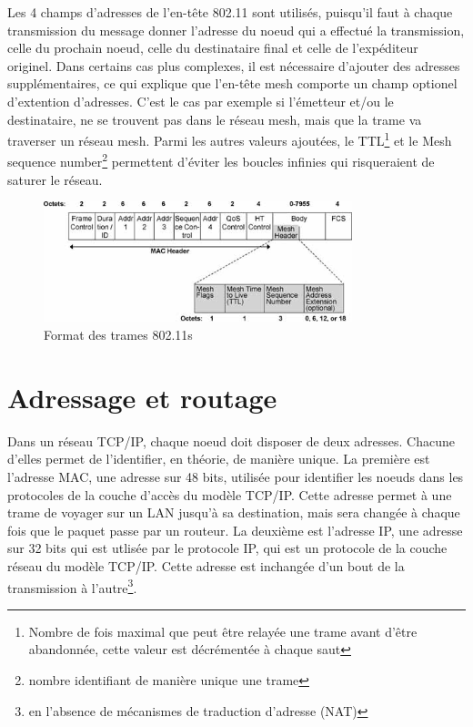 Les 4 champs d'adresses de l'en-tête 802.11 sont utilisés, puisqu'il faut à chaque transmission du message donner l'adresse
du noeud qui a effectué la transmission, celle du prochain noeud, celle du destinataire final et celle de l'expéditeur originel. 
Dans certains cas plus complexes, il est nécessaire d'ajouter des adresses supplémentaires, ce qui explique que l'en-tête mesh
comporte un champ optionel d'extention d'adresses. C'est le cas par exemple si l'émetteur et/ou le destinataire, ne se trouvent pas
dans le réseau mesh, mais que la trame va traverser un réseau mesh. Parmi les autres valeurs ajoutées, le TTL\footnote{Nombre de
fois maximal que peut être relayée une trame avant d'être abandonnée, cette valeur est décrémentée à chaque saut} et le Mesh sequence
number\footnote{nombre identifiant de manière unique une trame} permettent d'éviter les boucles infinies qui risqueraient de saturer
le réseau.


\begin{figure}
   \centering
   \includegraphics[width=0.8\textwidth,natwidth=488,natheight=513]{images/mesh_header.jpeg}
   \caption{Format des trames 802.11s}
\end{figure}

\section{Adressage et routage}

Dans un réseau TCP/IP, chaque noeud doit disposer de deux adresses. Chacune d'elles permet de l'identifier, en théorie, de manière 
unique. La première est l'adresse MAC, une adresse sur 48 bits, utilisée pour identifier les noeuds dans les protocoles de la 
couche d'accès du modèle TCP/IP. Cette adresse permet à une trame de voyager sur un LAN jusqu'à sa destination, mais sera changée
à chaque fois que le paquet passe par un routeur. La deuxième est l'adresse IP, une adresse sur 32 bits qui est utlisée par le
protocole IP, qui est un protocole de la couche réseau du modèle TCP/IP. Cette adresse est inchangée d'un bout de la transmission
à l'autre\footnote{en l'absence de mécanismes de traduction d'adresse (NAT)}.


